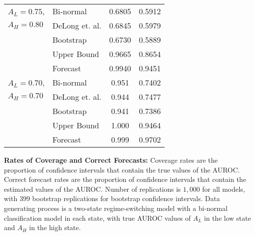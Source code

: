 \begin{table}[h!]
\begin{center}
\begin{tabular}{l l c c }
    \hline


$A_L = 0.75$, &
          Bi-normal &  0.6805 & 0.5912 \\
$A_H = 0.80$ &
     DeLong et. al. &  0.6845 & 0.5979 \\
 &         Bootstrap &  0.6730 & 0.5889 \\
 &       Upper Bound &  0.9665 & 0.8654 \\
 &          Forecast &  0.9940 & 0.9451 \\

    \hline


$A_L = 0.70$, &
          Bi-normal  &  0.951 & 0.7402 \\
$A_H = 0.70$ &
     DeLong et. al.  &  0.944 & 0.7477 \\
 &         Bootstrap  &  0.941 & 0.7386 \\
 &       Upper Bound  &  1.000 & 0.9464 \\
 &          Forecast  &  0.999 & 0.9702 \\

    \hline

    \end{tabular}


\end{center}

    \footnotesize

        \textbf{Rates of Coverage and Correct Forecasts:}
        Coverage rates are the proportion of confidence intervals that contain the true values of the AUROC.
        Correct forecast rates are the proportion of confidence intervals that contain the estimated values of the AUROC.
        Number of replications is $1,000$ for all models, with $399$ bootstrap replications for bootstrap confidence intervals.
        Data generating process is a two-state regime-switching model with a bi-normal classification model in each state,
        with true AUROC values of $A_L$ in the low state and $A_H$ in the high state.





\end{table}




